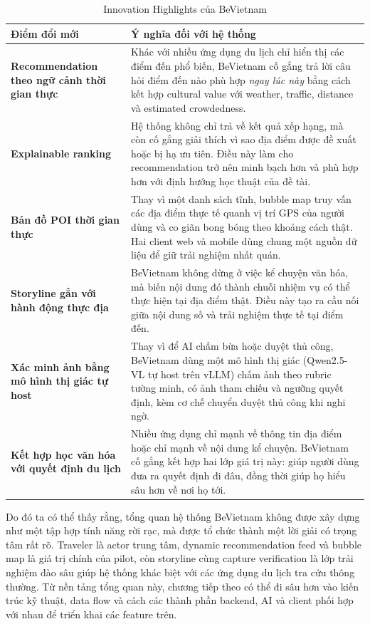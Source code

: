 \begin{table}[H]
\centering
\caption{Innovation Highlights của BeVietnam}
\label{tab:innovation_highlights}
\begin{tabularx}{\textwidth}{>{\raggedright\arraybackslash}p{3.3cm} X}
\toprule
\textbf{Điểm đổi mới} & \textbf{Ý nghĩa đối với hệ thống} \\
\midrule
\textbf{Recommendation theo ngữ cảnh thời gian thực} & Khác với nhiều ứng dụng du lịch chỉ hiển thị các điểm đến phổ biến, BeVietnam cố gắng trả lời câu hỏi điểm đến nào phù hợp \textit{ngay lúc này} bằng cách kết hợp cultural value với weather, traffic, distance và estimated crowdedness. \\
\textbf{Explainable ranking} & Hệ thống không chỉ trả về kết quả xếp hạng, mà còn cố gắng giải thích vì sao địa điểm được đề xuất hoặc bị hạ ưu tiên. Điều này làm cho recommendation trở nên minh bạch hơn và phù hợp hơn với định hướng học thuật của đề tài. \\
\textbf{Bản đồ POI thời gian thực} & Thay vì một danh sách tĩnh, bubble map truy vấn các địa điểm thực tế quanh vị trí GPS của người dùng và co giãn bong bóng theo khoảng cách thật. Hai client web và mobile dùng chung một nguồn dữ liệu để giữ trải nghiệm nhất quán. \\
\textbf{Storyline gắn với hành động thực địa} & BeVietnam không dừng ở việc kể chuyện văn hóa, mà biến nội dung đó thành chuỗi nhiệm vụ có thể thực hiện tại địa điểm thật. Điều này tạo ra cầu nối giữa nội dung số và trải nghiệm thực tế tại điểm đến. \\
\textbf{Xác minh ảnh bằng mô hình thị giác tự host} & Thay vì để AI chấm bừa hoặc duyệt thủ công, BeVietnam dùng một mô hình thị giác (Qwen2.5-VL tự host trên vLLM) chấm ảnh theo rubric tường minh, có ảnh tham chiếu và ngưỡng quyết định, kèm cơ chế chuyển duyệt thủ công khi nghi ngờ. \\
\textbf{Kết hợp học văn hóa với quyết định du lịch} & Nhiều ứng dụng chỉ mạnh về thông tin địa điểm hoặc chỉ mạnh về nội dung kể chuyện. BeVietnam cố gắng kết hợp hai lớp giá trị này: giúp người dùng đưa ra quyết định đi đâu, đồng thời giúp họ hiểu sâu hơn về nơi họ tới. \\
\bottomrule
\end{tabularx}
\end{table}

Do đó ta có thể thấy rằng, tổng quan hệ thống BeVietnam không được xây
dựng như một tập hợp tính năng rời rạc, mà được tổ chức thành một lời
giải có trọng tâm rất rõ. Traveler là actor trung tâm, dynamic
recommendation feed và bubble map là giá trị chính của pilot, còn
storyline cùng capture verification là lớp trải nghiệm đào sâu giúp hệ
thống khác biệt với các ứng dụng du lịch tra cứu thông thường. Từ nền
tảng tổng quan này, chương tiếp theo có thể đi sâu hơn vào kiến trúc kỹ
thuật, data flow và cách các thành phần backend, AI và client phối hợp
với nhau để triển khai các feature trên.
